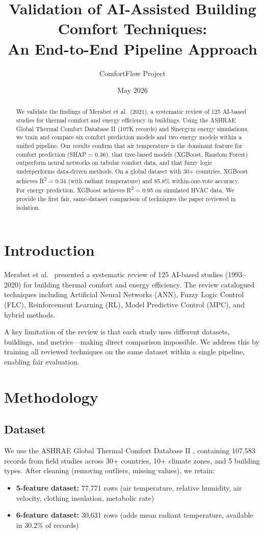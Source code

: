 \documentclass[11pt,a4paper]{article}
\title{Validation of AI-Assisted Building Comfort Techniques:\\An End-to-End Pipeline Approach}
\author{ComfortFlow Project}
\date{May 2026}
\begin{document}
\maketitle

\begin{abstract}
We validate the findings of Merabet et al.\ (2021), a systematic review of 125 AI-based studies for thermal comfort and energy efficiency in buildings. Using the ASHRAE Global Thermal Comfort Database II (107K records) and Sinergym energy simulations, we train and compare six comfort prediction models and two energy models within a unified pipeline. Our results confirm that air temperature is the dominant feature for comfort prediction (SHAP = 0.36), that tree-based models (XGBoost, Random Forest) outperform neural networks on tabular comfort data, and that fuzzy logic underperforms data-driven methods. On a global dataset with 30+ countries, XGBoost achieves R\textsuperscript{2} = 0.34 (with radiant temperature) and 85.8\% within-one-vote accuracy. For energy prediction, XGBoost achieves R\textsuperscript{2} = 0.95 on simulated HVAC data. We provide the first fair, same-dataset comparison of techniques the paper reviewed in isolation.
\end{abstract}

\section{Introduction}

Merabet et al.\ \cite{merabet2021} presented a systematic review of 125 AI-based studies (1993--2020) for building thermal comfort and energy efficiency. The review catalogued techniques including Artificial Neural Networks (ANN), Fuzzy Logic Control (FLC), Reinforcement Learning (RL), Model Predictive Control (MPC), and hybrid methods.

A key limitation of the review is that each study uses different datasets, buildings, and metrics---making direct comparison impossible. We address this by training all reviewed techniques on the same dataset within a single pipeline, enabling fair evaluation.

\section{Methodology}

\subsection{Dataset}
We use the ASHRAE Global Thermal Comfort Database II \cite{ashrae_db2}, containing 107,583 records from field studies across 30+ countries, 10+ climate zones, and 5 building types. After cleaning (removing outliers, missing values), we retain:
\begin{itemize}
    \item \textbf{5-feature dataset:} 77,771 rows (air temperature, relative humidity, air velocity, clothing insulation, metabolic rate)
    \item \textbf{6-feature dataset:} 30,631 rows (adds mean radiant temperature, available in 30.2\% of records)
\end{itemize}
\end{document}
